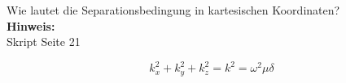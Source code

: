 \begin{question}[section=2,name={Seperationsbedingung},difficulty=,quantity=6,type=thr,tags={}]
	Wie lautet die Separationsbedingung in kartesischen Koordinaten?
	\\ \textbf{Hinweis:}\\
	Skript Seite 21
\end{question}
\begin{solution}
	\begin{equation}
	k_x^2+k_y^2+k_z^2 = k^2 = \omega^2\mu\delta
\end{equation}
\end{solution}